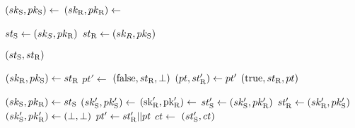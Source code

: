 \algrenewcommand\textproc{}
\algrenewcommand{}

\begin{minipage}{.5\linewidth}
  {\fontsize{8}{10}\selectfont

    \begin{algorithmic}[1]
    \State $(sk_\text{S},pk_\text{S}) \gets$ 
    \State $(sk_\text{R},pk_\text{R}) \gets$ 

    \State $st_\text{S} \gets (sk_S,pk_\text{R})$ 
    \State $st_\text{R} \gets (sk_R,pk_\text{S})$ 

    \State \Return $(st_\text{S},st_\text{R})$
    \EndProcedure
    \end{algorithmic}

    \vspace{10pt}

    \begin{algorithmic}[1]
    \State $(sk_\text{R},pk_\text{S}) \gets st_\text{R}$ 
    \State $pt' \gets$ 
    \State \Return $(\text{false}, st_\text{R}, \perp)$
    \EndIf
    \State $(pt,st_\text{R}') \gets pt'$
    \State \Return $(\text{true},st_\text{R}, pt)$
    \EndProcedure
   
  \end{algorithmic}
  }
\end{minipage}

\begin{minipage}{.5\linewidth}
  {\fontsize{8}{10}\selectfont

  \begin{algorithmic}[1]
    \State $(sk_\text{S},pk_\text{R}) \gets st_\text{S}$ 
    \State $(sk_\text{S}',pk_\text{S}') \gets$ 
    \State $(\text{sk}_\text{R}',\text{pk}_\text{R}') \gets$ 
    \State $st_\text{S}' \gets (sk_\text{S}',pk_\text{R}')$
    \State $st_\text{R}' \gets (sk_\text{R}',pk_\text{S}')$
    \Else
    \State $(sk_\text{S}',pk_\text{R}') \gets (\perp,\perp)$
    \EndIf
    \State $pt' \gets st_\text{R}' || pt$
    \State $ct \gets$ 
    \State \Return $(st_\text{S}', ct)$
    \EndProcedure
    
  \end{algorithmic}
  }
\end{minipage}
